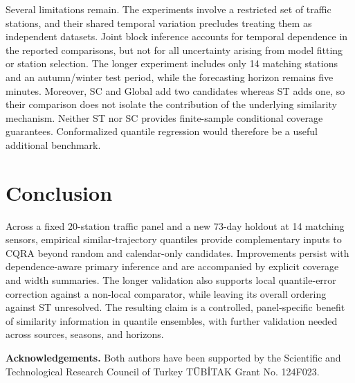 \documentclass[11pt]{article}
\begin{document}
Several limitations remain. The experiments involve a restricted
set of traffic stations, and their shared temporal variation
precludes treating them as independent datasets. Joint block
inference accounts for temporal dependence in the reported
comparisons, but not for all uncertainty arising from model
fitting or station selection. The longer experiment includes
only 14 matching stations and an autumn/winter test period,
while the forecasting horizon remains five minutes. Moreover,
SC and Global add two candidates whereas ST adds one, so
their comparison does not isolate the contribution of the
underlying similarity mechanism.
Neither ST nor SC provides finite-sample conditional coverage
guarantees. Conformalized quantile regression \cite{cqr}
would therefore be a useful additional benchmark.


\section{Conclusion}
Across a fixed 20-station traffic panel and a new 73-day holdout at 14 matching sensors, empirical similar-trajectory quantiles provide complementary inputs to CQRA beyond random and calendar-only candidates. Improvements persist with dependence-aware primary inference and are accompanied by explicit coverage and width summaries. The longer validation also supports local quantile-error correction against a non-local comparator, while leaving its overall ordering against ST unresolved. The resulting claim is a controlled, panel-specific benefit of similarity information in quantile ensembles, with further validation needed across sources, seasons, and horizons.

	\bigskip

\textbf{Acknowledgements.} Both authors have been supported by
the Scientific and Technological Research Council of Turkey
T\"UB\.{I}TAK Grant No. 124F023.
\end{document}
